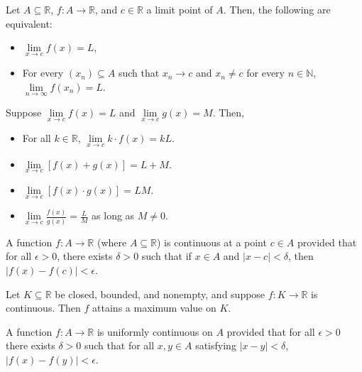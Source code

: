 \documentclass{article}
\begin{document}
\medskip
{}

    Let $A \subseteq \mathbb R$, $f: A \to \mathbb R$, and $c \in \mathbb R$ a limit point of $A$. Then, the following are equivalent:
    \begin{itemize}
        \item $\lim\limits_{x\to c} f(x) = L$,
        \item For every $(x_n) \subseteq A$ such that $x_n \to c$ and $x_n \neq c$ for every $n \in \mathbb N$, $\lim\limits_{n\to\infty} f(x_n)=L$.
    \end{itemize}

\medskip
{}

    Suppose $\lim\limits_{x\to c} f(x) = L$ and $\lim\limits_{x\to c}g(x) = M$. Then,
    \begin{itemize}
        \item For all $k \in \mathbb R$, $\lim\limits_{x\to c}k\cdot f(x) = kL$.
        \item $\lim\limits_{x\to c} [f(x) + g(x)] = L + M$.
        \item $\lim\limits_{x\to c} [f(x) \cdot g(x)] = LM$.
        \item $\lim\limits_{x\to c} \frac{f(x)}{g(x)} = \frac LM$ as long as $M \neq 0$.
    \end{itemize}

\medskip
{}

    A function $f: A \to \mathbb R$ (where $A \subseteq \mathbb R$) is continuous at a point $c \in A$ provided that for all $\epsilon > 0$, there exists $\delta > 0$ such that if $x \in A$ and $|x - c| < \delta$, then $|f(x) - f(c)| < \epsilon$.

\medskip
{}

    Let $K \subseteq \mathbb R$ be closed, bounded, and nonempty, and suppose $f:K \to \mathbb R$ is continuous. Then $f$ attains a maximum value on $K$.

\medskip
{}

    A function $f: A \to \mathbb R$ is uniformly continuous on $A$ provided that for all $\epsilon > 0$ there exists $\delta > 0$ such that for all $x, y \in A$ satisfying $|x - y| < \delta$, $|f(x) - f(y)| < \epsilon$.
\end{document}
